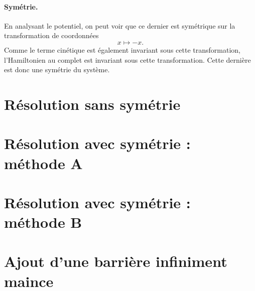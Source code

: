 \documentclass[11pt,a4paper,oneside]{article}
\begin{document}
\paragraph*{Symétrie.} En analysant le potentiel, on peut voir que ce dernier est symétrique sur la transformation de coordonnées
\begin{equation}
    x\mapsto-x.
\end{equation}
Comme le terme cinétique est également invariant sous cette transformation, l'Hamiltonien au complet est invariant sous cette transformation. Cette dernière est donc une symétrie du système.

\section{Résolution sans symétrie}

\section{Résolution avec symétrie : méthode A}

\section{Résolution avec symétrie : méthode B}

\section{Ajout d'une barrière infiniment maince}
\end{document}
